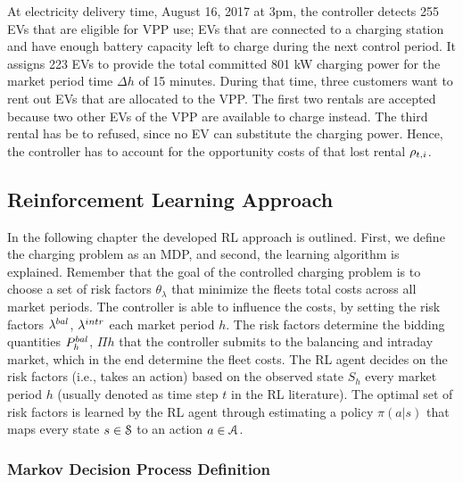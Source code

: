 \documentclass[a4paper, 12pt]{article}
\begin{document}
At electricity delivery time, August 16, 2017 at 3pm, the controller detects
255 EVs that are eligible for VPP use; EVs that are connected to a charging
station and have enough battery capacity left to charge during the next control
period. It assigns 223 EVs to provide the total committed 801 kW charging power
for the market period time \(\Delta h\) of 15 minutes. During that time, three
customers want to rent out EVs that are allocated to the VPP. The first two
rentals are accepted because two other EVs of the VPP are available to charge
instead. The third rental has be to refused, since no EV can substitute the
charging power. Hence, the controller has to account for the opportunity costs
of that lost rental \(\oc\).

\subsection{Reinforcement Learning Approach \label{sec-model-rl}}
\label{sec:org83a9eba}
In the following chapter the developed RL approach is outlined. First, we define
the charging problem as an MDP, and second, the learning algorithm is explained.
Remember that the goal of the controlled charging problem is to choose a set of
risk factors \(\theta_{\lambda}\) that minimize the fleets total costs across all
market periods. The controller is able to influence the costs, by setting the
risk factors \(\lb{}\), \(\li{}\) each market period \(h\). The risk factors determine
the bidding quantities \(\Pb{h}\), \(\Pi{h}\) that the controller submits to the
balancing and intraday market, which in the end determine the fleet costs. The
RL agent decides on the risk factors (i.e., takes an action) based on the
observed state \(S_{h}\) every market period \(h\) (usually denoted as time step \(t\)
in the RL literature). The optimal set of risk factors is learned by the RL
agent through estimating a policy \(\pi(a|s)\) that maps every state \(s\in\S\) to
an action \(a\in\A\).
\subsubsection{Markov Decision Process Definition}
\label{sec:orgd950bc6}
\end{document}
